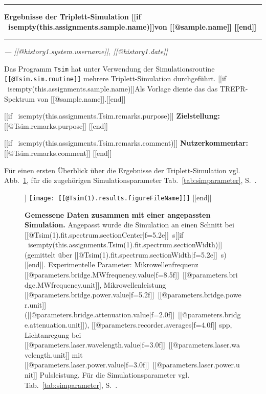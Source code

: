 \documentclass{article}
\begin{document}
\thispagestyle{empty}

\vspace*{-1.5cm}

\noindent\rule[1.5ex]{\textwidth}{1pt}

\begin{sffamily}\bfseries\large
Ergebnisse der Triplett-Simulation [[if ~isempty(this.assignments.sample.name)]]von [[@sample.name]] [[end]]
\end{sffamily}

\noindent\rule{\textwidth}{1pt}

\begin{flushright}\slshape
--- [[@history{1}.system.username]], [[@history{1}.date]]
\end{flushright}

\vspace*{1.5em}

Das Programm \texttt{Tsim} hat unter Verwendung der Simulationsroutine \texttt{[[@Tsim.sim.routine]]} mehrere Triplett-Simulation durchgeführt.
[[if ~isempty(this.assignments.sample.name)]]Als Vorlage diente das das TREPR-Spektrum von [[@sample.name]].[[end]]

[[if ~isempty(this.assignments.Tsim.remarks.purpose)]]
\textbf{Zielstellung:} [[@Tsim.remarks.purpose]]
[[end]]

[[if ~isempty(this.assignments.Tsim.remarks.comment)]]
\textbf{Nutzerkommentar:} [[@Tsim.remarks.comment]]
[[end]]

Für einen ersten Überblick über die Ergebnisse der Triplett-Simulation vgl. Abb.~\ref{fig:ergebnisse}, für die zugehörigen Simulationsparameter Tab.~\ref{tab:simparameter}, S.~\pageref{tab:simparameter}.


\begin{figure}[h]
\centering
[[if ~isempty(this.assignments.Tsim(1).results.figureFileName)]]
\texttt{[image: [[@Tsim(1).results.figureFileName]]]}
[[end]]
\caption{\textbf{Gemessene Daten zusammen mit einer angepassten Simulation.} Angepasst wurde die Simulation an einen Schnitt bei [[@Tsim(1).fit.spectrum.sectionCenter|f=5.2e]]~s[[if ~isempty(this.assignments.Tsim(1).fit.spectrum.sectionWidth)]] (gemittelt über [[@Tsim(1).fit.spectrum.sectionWidth|f=5.2e]]~s)[[end]]. Experimentelle Parameter: Mikrowellenfrequenz [[@parameters.bridge.MWfrequency.value|f=8.5f]]~[[@parameters.bridge.MWfrequency.unit]], Mikrowellenleistung [[@parameters.bridge.power.value|f=5.2f]]~[[@parameters.bridge.power.unit]] ([[@parameters.bridge.attenuation.value|f=2.0f]]~[[@parameters.bridge.attenuation.unit]]), [[@parameters.recorder.averages|f=4.0f]] spp, Lichtanregung bei [[@parameters.laser.wavelength.value|f=3.0f]]~[[@parameters.laser.wavelength.unit]] mit [[@parameters.laser.power.value|f=3.0f]]~[[@parameters.laser.power.unit]] Pulsleistung. Für die Simulationsparameter vgl. Tab.~\ref{tab:simparameter}, S.~\pageref{tab:simparameter}.}
\label{fig:ergebnisse}
\end{figure}
\end{document}
